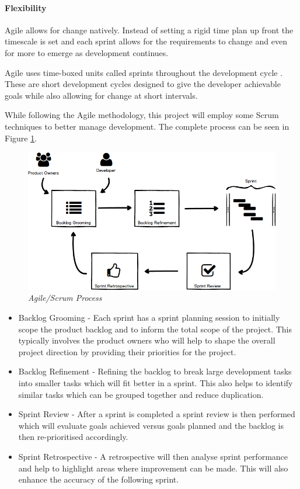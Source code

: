 \paragraph{Flexibility} Agile allows for change natively. Instead of setting a rigid time plan up front the timescale is set and each sprint allows for the requirements to change and even for more to emerge as development continues.

Agile uses time-boxed units called sprints throughout the development cycle \citep{Agile2016}. These are short development cycles designed to give the developer achievable goals while also allowing for change at short intervals.

While following the Agile methodology, this project will employ some Scrum techniques to better manage development. The complete process can be seen in Figure \ref{fig:agile}.

\begin{figure}[!ht]
\centering
\includegraphics*[width=\textwidth]{images/scrum_process}
\caption{\em Agile/Scrum Process}
\label{fig:agile}
\end{figure}

\begin{itemize}
	\item Backlog Grooming - Each sprint has a sprint planning session to initially scope the product backlog and to inform the total scope of the project. This typically involves the product owners who will help to shape the overall project direction by providing their priorities for the project.
	\item Backlog Refinement - Refining the backlog to break large development tasks into smaller tasks which will fit better in a sprint. This also helps to identify similar tasks which can be grouped together and reduce duplication.
	\item Sprint Review - After a sprint is completed a sprint review is then performed which will evaluate goals achieved versus goals planned and the backlog is then re-prioritised accordingly.
	\item Sprint Retrospective - A retrospective will then analyse sprint performance and help to highlight areas where improvement can be made. This will also enhance the accuracy of the following sprint.
\end{itemize}


